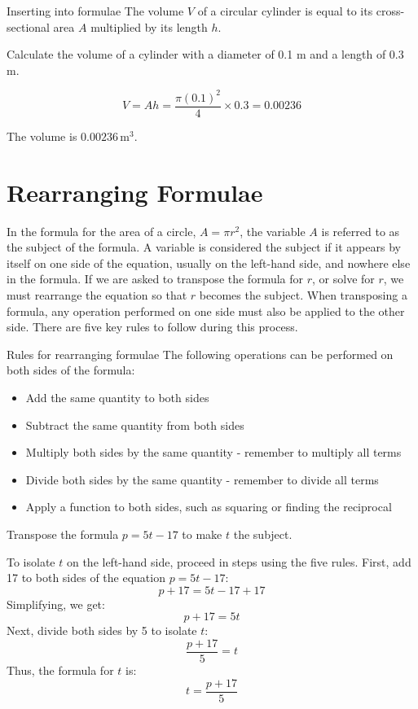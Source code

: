 \begin{example} Inserting into formulae \newline
The volume \(V\) of a circular cylinder is equal to its cross-sectional area \(A\) multiplied by its length \(h\).

Calculate the volume of a cylinder with a diameter of 0.1 m and a length of 0.3 m.

\begin{solution}
  \[
V = Ah = \frac{\pi (0.1)^2}{4} \times 0.3 = 0.00236
\]

The volume is \(0.00236 \, \text{m}^3\).
\end{solution}
\end{example}

\section{Rearranging Formulae}
In the formula for the area of a circle, \(A = \pi r^2\), the variable \(A\) is referred to as the subject of the formula. A variable is considered the subject if it appears by itself on one side of the equation, usually on the left-hand side, and nowhere else in the formula. If we are asked to transpose the formula for \(r\), or solve for \(r\), we must rearrange the equation so that \(r\) becomes the subject. When transposing a formula, any operation performed on one side must also be applied to the other side. There are five key rules to follow during this process.

\begin{custombox}{Rules for rearranging formulae}
The following operations can be performed on both sides of the formula:
\begin{itemize}
    \item Add the same quantity to both sides
    \item Subtract the same quantity from both sides
    \item Multiply both sides by the same quantity - remember to multiply all terms
    \item Divide both sides by the same quantity - remember to divide all terms
    \item Apply a function to both sides, such as squaring or finding the reciprocal
\end{itemize}
\end{custombox}

\begin{example} Transpose the formula \(p = 5t - 17\) to make \(t\) the subject.

\begin{solution}
 To isolate \(t\) on the left-hand side, proceed in steps using the five rules. First, add 17 to both sides of the equation \(p = 5t - 17\):
\[
p + 17 = 5t - 17 + 17
\]
Simplifying, we get:
\[
p + 17 = 5t
\]
Next, divide both sides by 5 to isolate \(t\):
\[
\frac{p + 17}{5} = t
\]
Thus, the formula for \(t\) is:
\[
t = \frac{p + 17}{5}
\]   
\end{solution}    
\end{example}

